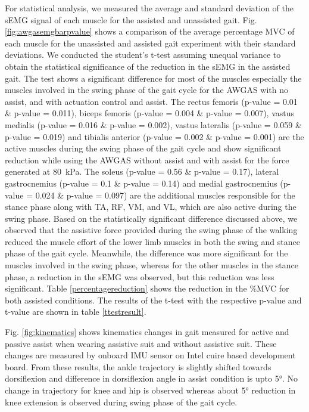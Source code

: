 \documentclass[paper,JRM,paper]{jaciiiarticle}
\begin{document}
For statistical analysis, we measured the average and standard deviation of the sEMG signal of each muscle for the assisted and unassisted gait. Fig. \ref{fig:awgasemgbarpvalue} shows a comparison of the average percentage MVC of each muscle for the unassisted and assisted gait experiment with their standard deviations. We conducted the student’s t-test assuming unequal variance to obtain the statistical significance of the reduction in the sEMG in the assisted gait. The test shows a significant difference for most of the muscles especially the muscles involved in the swing phase of the gait cycle for the AWGAS with no assist, and with actuation control and assist. The rectus femoris (p-value = 0.01 \& p-value = 0.011), biceps femoris (p-value = 0.004 \& p-value = 0.007), vastus medialis (p-value = 0.016 \& p-value = 0.002), vastus lateralis (p-value = 0.059 \& p-value = 0.019) and tibialis anterior  (p-value = 0.002 \& p-value = 0.001) are the active muscles during the swing phase of the gait cycle and show significant reduction while using the AWGAS without assist and with assist for the force generated at \SI{80}{\kilo\pascal}. The soleus (p-value = 0.56 \& p-value = 0.17), lateral gastrocnemius (p-value = 0.1 \& p-value = 0.14) and medial gastrocnemius (p-value = 0.024 \& p-value = 0.097) are the additional muscles responsible for the stance phase along with TA, RF, VM, and VL, which are also active during the swing phase. Based on the statistically significant difference discussed above, we observed that the assistive force provided during the swing phase of the walking reduced the muscle effort of the lower limb muscles in both the swing and stance phase of the gait cycle. Meanwhile, the difference was more significant for the muscles involved in the swing phase, whereas for the other muscles in the stance phase, a reduction in the sEMG was observed, but this reduction was less significant. Table \ref{percentagereduction} shows the reduction in the \%MVC for both assisted conditions. The results of the t-test with the respective p-value and t-value are shown in table \ref{ttestresult}. 

Fig. \ref{fig:kinematics} shows kinematics changes in gait measured for active and passive assist when wearing assistive suit and without assistive suit. These changes are measured by onboard IMU sensor on Intel cuire based development board. From these results, the ankle trajectory is slightly shifted towards dorsiflexion and difference in dorsiflexion angle in assist condition is upto \ang{5}. No change in trajectory for knee and hip is observed whereas about \ang{5} reduction in knee extension is observed during swing phase of the gait cycle. 
\end{document}

